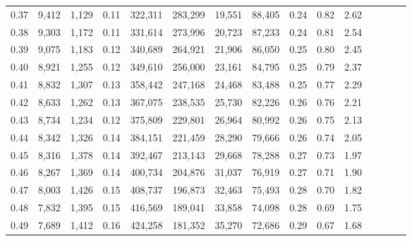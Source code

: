 \begin{tabular}{rrrcrrrrrrrrrrr}
0.37 &   9,412 &  1,129 &                                       0.11 &  322,311 &  283,299 &   19,551 &   88,405 &  0.24 &  0.82 &                         2.62 \\
0.38 &   9,303 &  1,172 &                                       0.11 &  331,614 &  273,996 &   20,723 &   87,233 &  0.24 &  0.81 &                         2.54 \\
0.39 &   9,075 &  1,183 &                                       0.12 &  340,689 &  264,921 &   21,906 &   86,050 &  0.25 &  0.80 &                         2.45 \\
0.40 &   8,921 &  1,255 &                                       0.12 &  349,610 &  256,000 &   23,161 &   84,795 &  0.25 &  0.79 &                         2.37 \\
0.41 &   8,832 &  1,307 &                                       0.13 &  358,442 &  247,168 &   24,468 &   83,488 &  0.25 &  0.77 &                         2.29 \\
0.42 &   8,633 &  1,262 &                                       0.13 &  367,075 &  238,535 &   25,730 &   82,226 &  0.26 &  0.76 &                         2.21 \\
0.43 &   8,734 &  1,234 &                                       0.12 &  375,809 &  229,801 &   26,964 &   80,992 &  0.26 &  0.75 &                         2.13 \\
0.44 &   8,342 &  1,326 &                                       0.14 &  384,151 &  221,459 &   28,290 &   79,666 &  0.26 &  0.74 &                         2.05 \\
0.45 &   8,316 &  1,378 &                                       0.14 &  392,467 &  213,143 &   29,668 &   78,288 &  0.27 &  0.73 &                         1.97 \\
0.46 &   8,267 &  1,369 &                                       0.14 &  400,734 &  204,876 &   31,037 &   76,919 &  0.27 &  0.71 &                         1.90 \\
0.47 &   8,003 &  1,426 &                                       0.15 &  408,737 &  196,873 &   32,463 &   75,493 &  0.28 &  0.70 &                         1.82 \\
0.48 &   7,832 &  1,395 &                                       0.15 &  416,569 &  189,041 &   33,858 &   74,098 &  0.28 &  0.69 &                         1.75 \\
0.49 &   7,689 &  1,412 &                                       0.16 &  424,258 &  181,352 &   35,270 &   72,686 &  0.29 &  0.67 &                         1.68 \\

\end{tabular}
